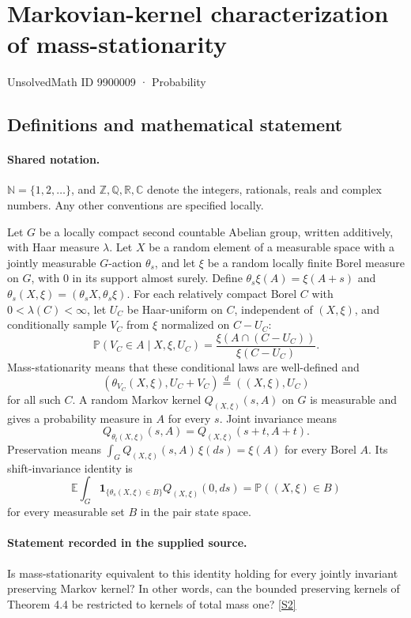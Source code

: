 \documentclass[11pt]{article}
\newcommand{\sref}[2]{\hyperlink{source:#1:#2}{[S#2]}}
\begin{document}
\setcounter{section}{9900008}
\section{Markovian-kernel characterization of mass-stationarity}\label{9900009}
{\small\sffamily UnsolvedMath ID 9900009 · Probability}
\subsection{Definitions and mathematical statement}

\paragraph{Shared notation.}$\mathbb N=\{1,2,\ldots\}$, and $\mathbb Z,\mathbb Q,\mathbb R,\mathbb C$ denote the integers, rationals, reals and complex numbers. Any other conventions are specified locally.


Let $G$ be a locally compact second countable Abelian group, written additively, with Haar measure $\lambda$. Let $X$ be a random element of a measurable space with a jointly measurable $G$-action $\theta_s$, and let $\xi$ be a random locally finite Borel measure on $G$, with $0$ in its support almost surely. Define $\theta_s\xi(A)=\xi(A+s)$ and $\theta_s(X,\xi)=(\theta_sX,\theta_s\xi)$. For each relatively compact Borel $C$ with $0<\lambda(C)<\infty$, let $U_C$ be Haar-uniform on $C$, independent of $(X,\xi)$, and conditionally sample $V_C$ from $\xi$ normalized on $C-U_C$:
\[\mathbb P(V_C\in A\mid X,\xi,U_C)=\frac{\xi(A\cap(C-U_C))}{\xi(C-U_C)}.\]
Mass-stationarity means that these conditional laws are well-defined and
\[(\theta_{V_C}(X,\xi),U_C+V_C)\stackrel d=((X,\xi),U_C)\]
for all such $C$. A random Markov kernel $Q_{(X,\xi)}(s,A)$ on $G$ is measurable and gives a probability measure in $A$ for every $s$. Joint invariance means
\[Q_{\theta_t(X,\xi)}(s,A)=Q_{(X,\xi)}(s+t,A+t).\]
Preservation means $\int_GQ_{(X,\xi)}(s,A)\,\xi(ds)=\xi(A)$ for every Borel $A$. Its shift-invariance identity is
\[\mathbb E\int_G\mathbf1_{\{\theta_s(X,\xi)\in B\}}Q_{(X,\xi)}(0,ds)=\mathbb P((X,\xi)\in B)\]
for every measurable set $B$ in the pair state space.
\paragraph{Statement recorded in the supplied source.}
Is mass-stationarity equivalent to this identity holding for every jointly invariant preserving Markov kernel? In other words, can the bounded preserving kernels of Theorem 4.4 be restricted to kernels of total mass one? \sref{9900009}{2}
\end{document}

